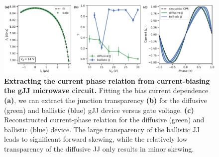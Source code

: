 \begin{figure}
	\centering
	\includegraphics[width=\linewidth]{chapter-gJJ-CPR/figs/Figure6}
	\caption{
	\textbf{Extracting the current phase relation from current-biasing the gJJ microwave circuit.}
	Fitting the bias current dependence \textbf{(a)}, we can extract the junction transparency \textbf{(b)} for the diffusive (green) and ballistic
(blue) gJJ device versus gate voltage.
	\textbf{(c)} Reconstructed current-phase relation for the diffusive (green) and ballistic (blue) device.
	The large transparency of the ballistic JJ leads to significant forward skewing, while the relatively low
transparency of the diffusive JJ only results in minor skewing.}
	\label{fig:figure6}
\end{figure}


